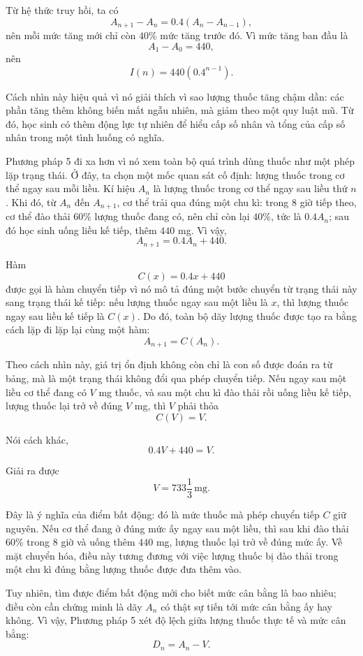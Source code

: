 {    Từ hệ thức truy hồi, ta có
    $$
    A_{n+1}-A_n=0.4(A_n-A_{n-1}),
    $$
    nên mỗi mức tăng mới chỉ còn $40\%$ mức tăng trước đó. Vì mức tăng ban đầu là
    $$
    A_1-A_0=440,
    $$
    nên
    $$
    I(n)=440(0.4^{n-1}).
    $$

    Cách nhìn này hiệu quả vì nó giải thích vì sao lượng thuốc tăng chậm dần: các phần tăng thêm không biến mất ngẫu nhiên, mà giảm theo một quy luật mũ. Từ đó, học sinh có thêm động lực tự nhiên để hiểu cấp số nhân và tổng của cấp số nhân trong một tình huống có nghĩa.

    Phương pháp 5 đi xa hơn vì nó xem toàn bộ quá trình dùng thuốc như một phép lặp trạng thái. Ở đây, ta chọn một mốc quan sát cố định: lượng thuốc trong cơ thể ngay sau mỗi liều. Kí hiệu $A_n$ là lượng thuốc trong cơ thể ngay sau liều thứ $n$. Khi đó, từ $A_n$ đến $A_{n+1}$, cơ thể trải qua đúng một chu kì: trong $8$ giờ tiếp theo, cơ thể đào thải $60\%$ lượng thuốc đang có, nên chỉ còn lại $40\%$, tức là $0.4A_n$; sau đó học sinh uống liều kế tiếp, thêm $440$ mg. Vì vậy,
    $$
    A_{n+1}=0.4A_n+440.
    $$

    Hàm
    $$
    C(x)=0.4x+440
    $$
    được gọi là hàm chuyển tiếp vì nó mô tả đúng một bước chuyển từ trạng thái này sang trạng thái kế tiếp: nếu lượng thuốc ngay sau một liều là $x$, thì lượng thuốc ngay sau liều kế tiếp là $C(x)$. Do đó, toàn bộ dãy lượng thuốc được tạo ra bằng cách lặp đi lặp lại cùng một hàm:
    $$
    A_{n+1}=C(A_n).
    $$

    Theo cách nhìn này, giá trị ổn định không còn chỉ là con số được đoán ra từ bảng, mà là một trạng thái không đổi qua phép chuyển tiếp. Nếu ngay sau một liều cơ thể đang có $V$ mg thuốc, và sau một chu kì đào thải rồi uống liều kế tiếp, lượng thuốc lại trở về đúng $V$ mg, thì $V$ phải thỏa
    $$
    C(V)=V.
    $$

    Nói cách khác,
    $$
    0.4V+440=V.
    $$

    Giải ra được
    $$
    V=733\frac{1}{3}\, \text{mg}.
    $$

    Đây là ý nghĩa của điểm bất động: đó là mức thuốc mà phép chuyển tiếp $C$ giữ nguyên. Nếu cơ thể đang ở đúng mức ấy ngay sau một liều, thì sau khi đào thải $60\%$ trong $8$ giờ và uống thêm $440$ mg, lượng thuốc lại trở về đúng mức ấy. Về mặt chuyển hóa, điều này tương đương với việc lượng thuốc bị đào thải trong một chu kì đúng bằng lượng thuốc được đưa thêm vào.

    Tuy nhiên, tìm được điểm bất động mới cho biết mức cân bằng là bao nhiêu; điều còn cần chứng minh là dãy $A_n$ có thật sự tiến tới mức cân bằng ấy hay không. Vì vậy, Phương pháp 5 xét độ lệch giữa lượng thuốc thực tế và mức cân bằng:
    $$
    D_n=A_n-V.
    $$

}
